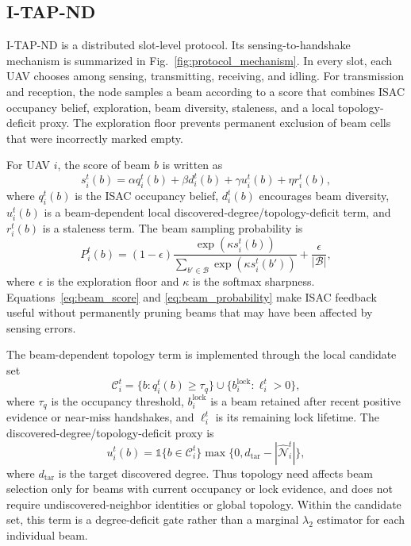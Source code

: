 \documentclass[journal]{IEEEtran}
\newcommand{\method}{I-TAP-ND}
\newcommand{\beamset}{\mathcal{B}}
\begin{document}
\subsection{\method{}}
\method{} is a distributed slot-level protocol.
Its sensing-to-handshake mechanism is summarized in Fig.~\ref{fig:protocol_mechanism}.
In every slot, each UAV chooses among sensing, transmitting, receiving, and idling.
For transmission and reception, the node samples a beam according to a score that combines ISAC occupancy belief, exploration, beam diversity, staleness, and a local topology-deficit proxy.
The exploration floor prevents permanent exclusion of beam cells that were incorrectly marked empty.

For UAV $i$, the score of beam $b$ is written as
\begin{equation}
  s_i^t(b)=
  \alpha q_i^t(b)
  + \beta d_i^t(b)
  + \gamma u_i^t(b)
  + \eta r_i^t(b),
  \label{eq:beam_score}
\end{equation}
where $q_i^t(b)$ is the ISAC occupancy belief, $d_i^t(b)$ encourages beam diversity, $u_i^t(b)$ is a beam-dependent local discovered-degree/topology-deficit term, and $r_i^t(b)$ is a staleness term.
The beam sampling probability is
\begin{equation}
  P_i^t(b) =
  (1-\epsilon)\frac{\exp(\kappa s_i^t(b))}{\sum_{b'\in\beamset}\exp(\kappa s_i^t(b'))}
  + \frac{\epsilon}{|\beamset|},
  \label{eq:beam_probability}
\end{equation}
where $\epsilon$ is the exploration floor and $\kappa$ is the softmax sharpness.
Equations~\eqref{eq:beam_score} and \eqref{eq:beam_probability} make ISAC feedback useful without permanently pruning beams that may have been affected by sensing errors.

The beam-dependent topology term is implemented through the local candidate set
\begin{equation}
  \mathcal{C}_i^t =
  \{b:q_i^t(b)\ge \tau_q\}
  \cup
  \{b_i^{\mathrm{lock}}:\ell_i^t>0\},
  \label{eq:candidate_set}
\end{equation}
where $\tau_q$ is the occupancy threshold, $b_i^{\mathrm{lock}}$ is a beam retained after recent positive evidence or near-miss handshakes, and $\ell_i^t$ is its remaining lock lifetime.
The discovered-degree/topology-deficit proxy is
\begin{equation}
  u_i^t(b)=
  \mathbb{1}\{b\in\mathcal{C}_i^t\}
  \max\{0,d_{\mathrm{tar}}-|\hat{\mathcal{N}}_i^t|\},
  \label{eq:topology_value}
\end{equation}
where $d_{\mathrm{tar}}$ is the target discovered degree.
Thus topology need affects beam selection only for beams with current occupancy or lock evidence, and does not require undiscovered-neighbor identities or global topology.
Within the candidate set, this term is a degree-deficit gate rather than a marginal $\lambda_2$ estimator for each individual beam.
\end{document}
